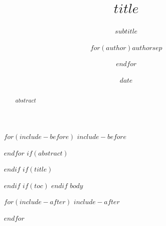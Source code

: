 \documentclass[11pt$for(classoption)$,$classoption$$endfor$]{article}
\title{$title$}
\subtitle{$subtitle$}
\author{$for(author)$$author$$sep$ \and $endfor$}
\affiliation{$affiliation$}
\date{$date$}
\begin{document}
$for(include-before)$
$include-before$

$endfor$
$if(abstract)$
\begin{abstract}
$abstract$
\end{abstract}
$endif$
$if(title)$
\maketitle
$endif$
$if(toc)$
{\setcounter{tocdepth}{$if(toc-depth)$$toc-depth$$else$2$endif$}\tableofcontents}
$endif$
$body$

$for(include-after)$
$include-after$

$endfor$
\end{document}
